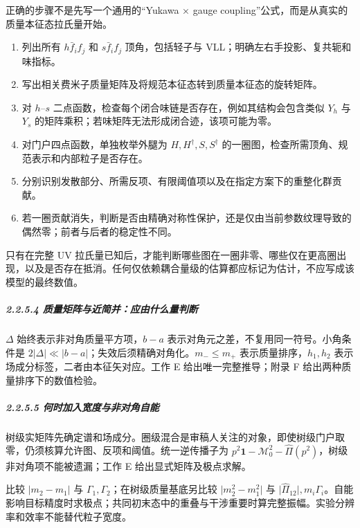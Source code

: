 \documentclass[
]{article}
\providecommand{\tightlist}{%
  \setlength{\itemsep}{0pt}\setlength{\parskip}{0pt}}
\begin{document}
正确的步骤不是先写一个通用的``Yukawa × gauge
coupling''公式，而是从真实的质量本征态拉氏量开始。

\begin{enumerate}
\def\labelenumi{\arabic{enumi}.}
\tightlist
\item
  列出所有 \(h\bar f_i f_j\) 和 \(s\bar f_i f_j\) 顶角，包括轻子与
  VLL；明确左右手投影、复共轭和味指标。
\item
  写出相关费米子质量矩阵及将规范本征态转到质量本征态的旋转矩阵。
\item
  对 \(h\)--\(s\)
  二点函数，检查每个闭合味链是否存在，例如其结构会包含类似 \(Y_h\) 与
  \(Y_s\) 的矩阵乘积；若味矩阵无法形成闭合迹，该项可能为零。
\item
  对门户四点函数，单独枚举外腿为 \(H,H^\dagger,S,S^\dagger\)
  的一圈图，检查所需顶角、规范表示和内部粒子是否存在。
\item
  分别识别发散部分、所需反项、有限阈值项以及在指定方案下的重整化群贡献。
\item
  若一圈贡献消失，判断是否由精确对称性保护，还是仅由当前参数纹理导致的偶然零；前者与后者的稳定性不同。
\end{enumerate}

只有在完整 UV
拉氏量已知后，才能判断哪些图在一圈非零、哪些仅在更高圈出现，以及是否存在抵消。任何仅依赖耦合量级的估算都应标记为估计，不应写成该模型的最终数值。

\subparagraph{2.2.5.4
质量矩阵与近简并：应由什么量判断}\label{ux8d28ux91cfux77e9ux9635ux4e0eux8fd1ux7b80ux5e76ux5e94ux7531ux4ec0ux4e48ux91cfux5224ux65ad}

\(\Delta\) 始终表示非对角质量平方项，\(b-a\)
表示对角元之差，不复用同一符号。小角条件是
\(2\lvert\Delta\rvert\ll\lvert b-a\rvert\)；失效后须精确对角化。\(m_-\le m_+\)
表示质量排序，\(h_1,h_2\) 表示场成分标签，二者由本征矢对应。工作 E
给出唯一完整推导；附录 F 给出两种质量排序下的数值检验。

\subparagraph{2.2.5.5
何时加入宽度与非对角自能}\label{ux4f55ux65f6ux52a0ux5165ux5bbdux5ea6ux4e0eux975eux5bf9ux89d2ux81eaux80fd}

树级实矩阵先确定谱和场成分。圈级混合是审稿人关注的对象，即使树级门户取零，仍须核算允许图、反项和阈值。统一逆传播子为
\(p^2\mathbf1-\mathcal M_0^2-\widehat\Pi(p^2)\)，树级非对角项不能被遗漏；工作
E 给出显式矩阵及极点求解。

比较 \(\lvert m_2-m_1\rvert\) 与
\(\Gamma_1,\Gamma_2\)；在树级质量基底另比较 \(\lvert m_2^2-m_1^2\rvert\)
与
\(\lvert\widehat\Pi_{12}\rvert,m_i\Gamma_i\)。自能影响目标精度时求极点；共同初末态中的重叠与干涉重要时算完整振幅。实验分辨率和效率不能替代粒子宽度。
\end{document}

